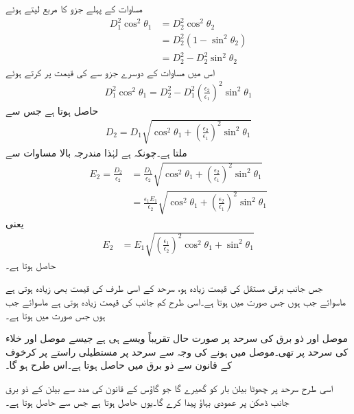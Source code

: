 مساوات  کے پہلے جزو کا مربع لیتے ہوئے
\begin{align*}
D_1^2 \cos^2 \theta_1&=D_2^2 \cos^2 \theta_2\\
&=D_2^2 (1-\sin^2 \theta_2)\\
&=D_2^2-D_2^2 \sin^2\theta_2
\end{align*}
اس میں مساوات  کے دوسرے جزو سے  کی قیمت پر کرتے ہوئے
\begin{align*}
D_1^2 \cos^2\theta_1=D_2^2-D_1^2 \left(\frac{\epsilon_2}{\epsilon_1}\right)^2\sin^2\theta_1
\end{align*}
حاصل ہوتا ہے جس سے
\begin{align}
D_2=D_1\sqrt{\cos^2\theta_1+\left(\frac{\epsilon_2}{\epsilon_1}\right)^2\sin^2\theta_1}
\end{align}
ملتا ہے۔چونکہ  ہے لہٰذا مندرجہ بالا مساوات سے
\begin{align*}
E_2=\frac{D_2}{\epsilon_2}&=\frac{D_1}{\epsilon_2}\sqrt{\cos^2\theta_1+\left(\frac{\epsilon_2}{\epsilon_1}\right)^2\sin^2\theta_1}\\
&=\frac{\epsilon_1 E_1}{\epsilon_2}\sqrt{\cos^2\theta_1+\left(\frac{\epsilon_2}{\epsilon_1}\right)^2\sin^2\theta_1}
\end{align*}
یعنی
\begin{align}
E_2&=E_1\sqrt{\left(\frac{\epsilon_1}{\epsilon_2} \right)^2\cos^2\theta_1+\sin^2\theta_1}
\end{align}
حاصل ہوتا ہے۔

جس جانب برقی مستقل کی قیمت  زیادہ ہو، سرحد کے اسی طرف  کی قیمت بھی زیادہ ہوتی ہے ماسوائے جب  ہوں جس صورت میں   ہوتا ہے۔اسی طرح کم  جانب  کی قیمت زیادہ ہوتی ہے ماسوائے جب  ہوں جس صورت میں  ہوتا ہے۔

موصل اور ذو برق کی سرحد پر صورت حال تقریباً ویسے ہی ہے جیسے موصل اور خلاء کی سرحد پر تھی۔موصل میں  ہونے کی وجہ سے سرحد پر مستطیلی راستے پر کرخوف کے قانون سے ذو برق میں  حاصل ہوتا ہے۔اس طرح  ہو گا۔

اسی طرح سرحد پر چھوٹا بیلن  بار کو گھیرے گا جو گاؤس کے قانون کی مدد سے بیلن کے ذو برق جانب ڈھکن پر  عمودی بہاؤ  پیدا کرے گا۔یوں  حاصل ہوتا ہے جس سے  حاصل ہوتا ہے۔


